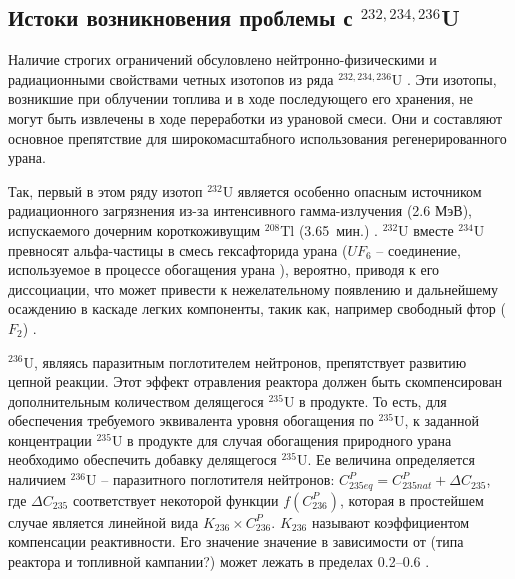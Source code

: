 \subsection{Истоки возникновения проблемы с $^{232,234,236}$U}

Наличие строгих ограничений обсуловлено нейтронно-физическими и радиационными свойствами четных изотопов из ряда $^{232,234,236}$U \cite{smirnovEvolutionIsotopicComposition2012, proselkovAnalizVozmozhnostiIspolzovaniya2003, dudnikovInfluence236UEfficacy2016}. Эти изотопы, возникшие при облучении топлива и в ходе последующего его хранения, не могут быть извлечены в ходе переработки из урановой смеси. Они и составляют основное препятствие для широкомасштабного использования регенерированного урана.

Так, первый в этом ряду изотоп $^{232}$U является особенно опасным источником радиационного загрязнения из-за интенсивного гамма-излучения (2.6 МэВ), испускаемого дочерним короткоживущим $^{208}$Tl (3.65 мин.) \cite{matveevUran232EgoVliyanie1985,abbasProliferationResistanceFeatures2013}.
$^{232}$U вместе $^{234}$U превносят альфа-частицы в смесь гексафторида урана ($UF_6$ -- соединение, используемое в процессе обогащения урана \cite{orlovWayObtainUranium2015, orlovDesublimationPurificationTransporting2017}), вероятно, приводя к его диссоциации, что может привести к нежелательному появлению и дальнейшему осаждению в каскаде легких компоненты, такик как, например свободный фтор ($F_2$) \cite{kryuchkovObogashchennyyUranDobavleniem2007, bernhardtRadiationEffectsAlpha1958, shmelevRazrabotkaRaschetnoyModeli2012}.

$^{236}$U, являясь паразитным поглотителем нейтронов, препятствует развитию цепной реакции. Этот эффект отравления реактора должен быть скомпенсирован дополнительным количеством делящегося $^{235}$U в продукте. То есть, для обеспечения требуемого эквивалента уровня обогащения по $^{235}$U, к заданной концентрации $^{235}$U в продукте для случая обогащения природного урана необходимо обеспечить добавку делящегося $^{235}$U. Ее величина определяется наличием $^{236}$U -- паразитного  поглотителя нейтронов:
$C_{235 e q}^{P}=C_{235 n a t}^{P}+\Delta C_{235}$, где $\Delta C_{235}$ соответствует некоторой функции $f\left(C_{236}^{P}\right)$, которая в простейшем случае является линейной вида $K_{236} \times C_{236}^{P}$. $K_{236}$ называют коэффициентом компенсации реактивности. Его значение значение в зависимости от (типа реактора и топливной кампании?) может лежать в пределах 0.2--0.6 \cite{delagarzaMulticomponentIsotopeSeparation1961, delculAnalysisReuseUranium2009}. 

